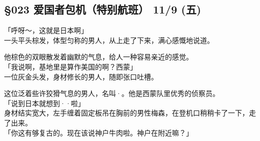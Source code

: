 \subsection{§023 爱国者包机（特别航班） 11/9 (五)}

「呼呀～，这就是日本啊」\\

一头平头棕发，体型匀称的男人，从上走了下来，满心感慨地说道。

他棕色的双眼散发着幽默的气息，给人一种容易亲近的感觉。\\

「我说啊，基地里是算作美国的啊？西蒙」\\

一位灰金头发，身材修长的男人，随即张口吐槽。

这位泛着些许狡猾气息的男人，名叫·。他是西蒙队里优秀的侦察员。\\

「说到日本就想到··啦」\\

身材结实宽大，左手缠着固定板吊在胸前的男性梅森，在登机口稍稍卡了一下，走了出来。\\

「你这有够复古的。现在该说神户牛肉啦。神户在附近嘛？」\\


